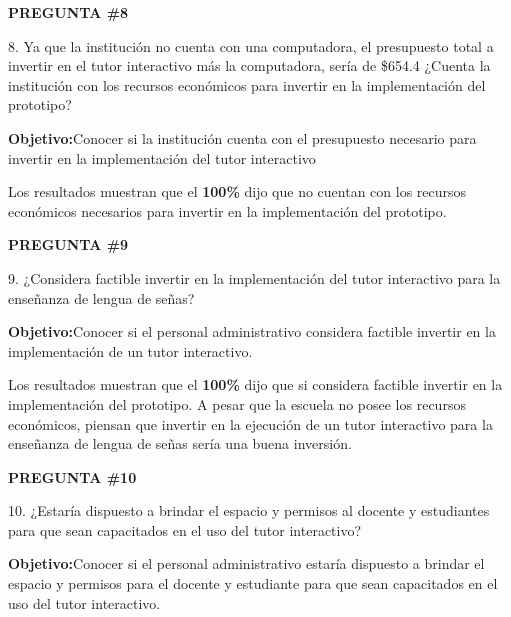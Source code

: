 \documentclass[12pt]{report}%
\begin{document}
\newpage
\textbf{PREGUNTA \#8}

8. Ya que la institución no cuenta con una computadora, el presupuesto total a invertir en el tutor interactivo más la computadora, sería de \$654.4 ¿Cuenta la institución con los recursos económicos para invertir en la implementación del prototipo?

\textbf{Objetivo:}Conocer si la institución cuenta con el presupuesto necesario para invertir en la implementación del tutor interactivo

\begin{center}
\end{center}


Los resultados muestran que el \textbf{ 100\%} dijo que no cuentan con los recursos económicos necesarios para invertir en la implementación del prototipo. 


\newpage
\textbf{PREGUNTA \#9}

9. ¿Considera factible invertir en la implementación del tutor interactivo para la enseñanza de lengua de señas?

\textbf{Objetivo:}Conocer si el personal administrativo considera factible invertir en la implementación de un tutor interactivo.

\begin{center}
\end{center}


Los resultados muestran que el \textbf{ 100\%} dijo que si considera factible invertir en la implementación del prototipo. A pesar que la escuela no posee los recursos económicos, piensan que invertir en la ejecución de un tutor interactivo para la enseñanza de lengua de señas sería una buena inversión. 


\newpage
\textbf{PREGUNTA \#10}

10. ¿Estaría dispuesto a brindar el espacio y permisos al docente y estudiantes para que sean capacitados en el uso del tutor interactivo?

\textbf{Objetivo:}Conocer si el personal administrativo estaría dispuesto a brindar el espacio y permisos para el docente y estudiante para que sean capacitados en el uso del tutor interactivo.
\end{document}
